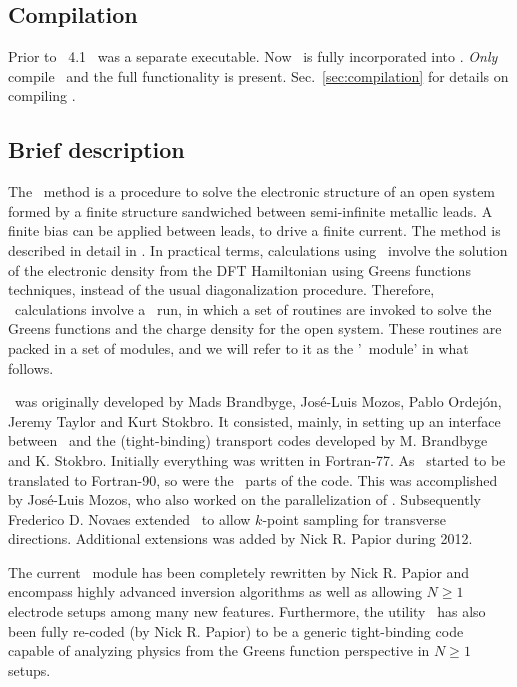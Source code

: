 \subsection{Compilation}

Prior to \siesta\ 4.1 \tsiesta\ was a separate executable. Now
\tsiesta\ is fully incorporated into \siesta. \emph{Only} compile
\siesta\ and the full functionality is present.
Sec.~\ref{sec:compilation} for details on compiling \siesta.

\subsection{Brief description}

The \tsiesta\ method is a procedure to solve the electronic
structure of an open system formed by a finite structure sandwiched
between semi-infinite metallic leads. A finite bias can be applied
between leads, to drive a finite current. The method is described
in detail in \citet{Brandbyge2002,Papior2017}. In practical terms,
calculations using \tsiesta\ involve the solution of the
electronic density from the DFT Hamiltonian using Greens functions
techniques, instead of the usual diagonalization procedure. Therefore,
\tsiesta\ calculations involve a \siesta\ run, in which a
set of routines are invoked to solve the Greens functions and the
charge density for the open system. These routines are packed in a set
of modules, and we will refer to it as the '\tsiesta\ module'
in what follows.

\tsiesta\ was originally developed by Mads Brandbyge, Jos\'e-Luis
Mozos, Pablo Ordej\'on, Jeremy Taylor and Kurt
Stokbro\cite{Brandbyge2002}. It consisted, mainly, in setting up an
interface between \siesta\ and the (tight-binding) transport codes
developed by M. Brandbyge and K. Stokbro. Initially everything was
written in Fortran-77. As \siesta\ started to be translated to
Fortran-90, so were the \tsiesta\ parts of the code. This was
accomplished by Jos\'e-Luis Mozos, who also worked on the
parallelization of \tsiesta.
%
Subsequently Frederico D. Novaes extended \tsiesta\ to allow $k$-point
sampling for transverse directions. Additional extensions was
added by Nick R. Papior during 2012.

The current \tsiesta\ module has been completely rewritten by Nick
R. Papior and encompass highly advanced inversion algorithms as well
as allowing $N\geq1$ electrode setups among many new
features. Furthermore, the utility \tbtrans\ has also been fully
re-coded (by Nick R. Papior) to be a generic tight-binding code
capable of analyzing physics from the Greens function perspective in
$N\ge1$ setups\cite{Papior2017}.


